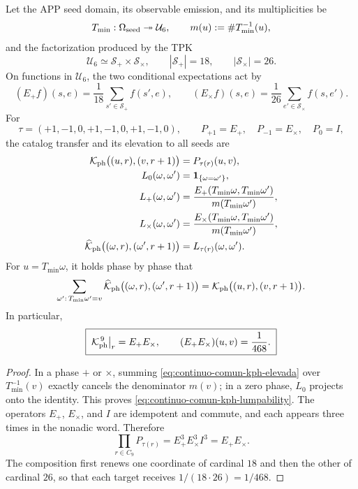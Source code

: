 \begin{proposition}
\label{prop:continuo-comun-kph-heredada}
\label{pII-full:thm:seleccion-novena-fase}
Let the APP seed domain, its observable emission, and its multiplicities be
\[
 T_{\min}:\Omega_{\rm seed}\twoheadrightarrow\mathcal U_6,
 \qquad
 m(u):=\#T_{\min}^{-1}(u),
\]
and the factorization produced by the TPK
\[
 \mathcal U_6\simeq\mathcal S_+\times\mathcal S_\times,
 \qquad |\mathcal S_+|=18,\qquad |\mathcal S_\times|=26.
\]
On functions in \(\mathcal U_6\), the two conditional expectations act
by
\[
 (E_+f)(s,e)=\frac1{18}\sum_{s'\in\mathcal S_+}f(s',e),
 \qquad
 (E_\times f)(s,e)=\frac1{26}
 \sum_{e'\in\mathcal S_\times}f(s,e').
\]
For
\[
 \tau=(+1,-1,0,+1,-1,0,+1,-1,0),
 \qquad
 P_{+1}=E_+,\quad P_{-1}=E_\times,\quad P_0=I,
\]
the catalog transfer and its elevation to all seeds are
\begin{align}
 \mathcal K_{\rm ph}\bigl((u,r),(v,r+1)\bigr)
 &=P_{\tau(r)}(u,v),
 \label{eq:continuo-comun-kph-catalogo}\\
 L_0(\omega,\omega')&=\mathbf1_{\{\omega=\omega'\}},\nonumber\\
 L_+(\omega,\omega')
 &=\frac{E_+(T_{\min}\omega,T_{\min}\omega')}
         {m(T_{\min}\omega')},\nonumber\\
 L_\times(\omega,\omega')
 &=\frac{E_\times(T_{\min}\omega,T_{\min}\omega')}
         {m(T_{\min}\omega')},\nonumber\\
 \widehat{\mathcal K}_{\rm ph}
 \bigl((\omega,r),(\omega',r+1)\bigr)
 &=L_{\tau(r)}(\omega,\omega').
 \label{eq:continuo-comun-kph-elevada}
\end{align}
For \(u=T_{\min}\omega\), it holds phase by phase that
\begin{equation}
\label{eq:continuo-comun-kph-lumpability}
 \sum_{\omega':\,T_{\min}\omega'=v}
 \widehat{\mathcal K}_{\rm ph}
 \bigl((\omega,r),(\omega',r+1)\bigr)
 =
 \mathcal K_{\rm ph}\bigl((u,r),(v,r+1)\bigr).
\end{equation}
In particular,
\begin{equation}
\label{eq:continuo-comun-kph-novena-potencia}
 \boxed{\;
 \mathcal K_{\rm ph}^{\,9}\big|_r=E_+E_\times,
 \qquad
 (E_+E_\times)(u,v)=\frac1{468}.
 \;}
\end{equation}
\end{proposition}

\begin{proof}
In a phase \(+\) or \(\times\), summing
\eqref{eq:continuo-comun-kph-elevada} over
\(T_{\min}^{-1}(v)\) exactly cancels the denominator \(m(v)\); in a
zero phase, \(L_0\) projects onto the identity. This proves
\eqref{eq:continuo-comun-kph-lumpability}. The operators \(E_+\),
\(E_\times\), and \(I\) are idempotent and commute, and each appears three
times in the nonadic word. Therefore
\[
 \prod_{r\in C_9}P_{\tau(r)}
 =E_+^3E_\times^3I^3=E_+E_\times.
\]
The composition first renews one coordinate of cardinal \(18\) and then
the other of cardinal \(26\), so that each target receives
\(1/(18\cdot26)=1/468\).
\end{proof}

